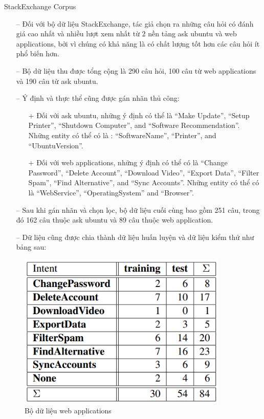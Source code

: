 StackExchange Corpus

\begin{itemize}
    \item[--] Đối với bộ dữ liệu StackExchange, tác giả chọn ra những câu hỏi có đánh giá cao nhất và nhiều lượt xem nhất từ 2 nền tảng ask ubuntu và web applications,  bởi vì chúng có khả năng là có chất lượng tốt hơn các câu hỏi ít phổ biến hơn.
        \item[--]Bộ dữ liệu thu được tổng cộng là 290 câu hỏi, 100 câu từ web applications và 190 câu từ ask ubuntu.
        \item[--]Ý định và thực thể cũng được gán nhãn thủ công:
        \begin{itemize}
            \item[+]Đối với ask ubuntu, những ý định có thể là “Make Update”, “Setup Printer”, “Shutdown Computer”, and “Software Recommendation”. Những entity có thể có là : “SoftwareName”, “Printer”, and “UbuntuVersion”.
            \item[+] Đối với web applications, những ý định có thể có là “Change Password”, “Delete Account”, “Download Video”, “Export Data”, “Filter Spam”, “Find Alternative”, and “Sync Accounts”. Những entity có thể có là “WebService”, “OperatingSystem” and “Browser”.
        \end{itemize}
    \item[--] Sau khi gán nhãn và chọn lọc, bộ dữ liệu cuối cùng bao gồm 251 câu, trong đó 162 câu thuộc ask ubuntu và 89 câu thuộc web application.
    \item[--] Dữ liệu cũng được chia thành dữ liệu huấn luyện và dữ liệu kiểm thử như bảng sau:
\end{itemize}

\begin{figure}[htp]
    \centering
    \includegraphics[width=10cm]{images/comparisonimg/webappdatasets.png}
    \caption{Bộ dữ liệu web applications}
    \label{fig:comparisonimg-webappdatasets}
\end{figure}

